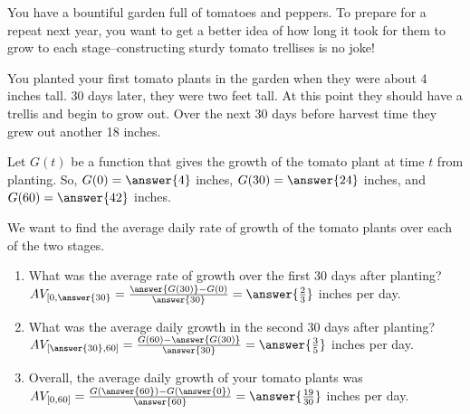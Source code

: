 \documentclass{ximera}
\author{Elizabeth Campolongo}
\begin{document}
\begin{exercise}
You have a bountiful garden full of tomatoes and peppers. To prepare for a repeat next year, you want to get a better idea of how long it took for them to grow to each stage--constructing sturdy tomato trellises is no joke!

You planted your first tomato plants in the garden when they were about 4 inches tall. 30 days later, they were two feet tall. At this point they should have a trellis and begin to grow out. Over the next 30 days before harvest time they grew out another 18 inches. 

Let $G(t)$ be a function that gives the growth of the tomato plant at time $t$ from planting. So, $G(0) = \answer{4}$ inches, $G(30) = \answer{24}$ inches, and $G(60) = \answer{42}$ inches.
%
\begin{exercise}
We want to find the average daily rate of growth of the tomato plants over each of the two stages.
\begin{enumerate}
\item What was the average rate of growth over the first 30 days after planting? \\
$AV_{[0,\answer{30}} = \frac{\answer{G(30)} - G(0)}{\answer{30}} = \answer{\frac{2}{3}}$ inches per day.

\item What was the average daily growth in the second 30 days after planting?\\
$AV_{[\answer{30},60]} = \frac{G(60)- \answer{G(30)}}{\answer{30}} = \answer{\frac{3}{5}}$ inches per day.

\item Overall, the average daily growth of your tomato plants was \\
$AV_{[0,60]} = \frac{G(\answer{60})- G(\answer{0})}{\answer{60}} = \answer{\frac{19}{30}}$ inches per day.


\end{enumerate}
\end{exercise}
\end{exercise}
\end{document}
